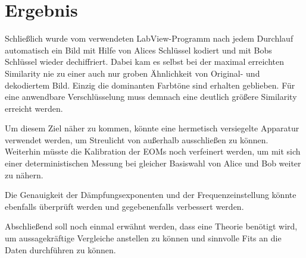 \section{Ergebnis}

Schließlich wurde vom verwendeten LabView-Programm nach jedem Durchlauf
automatisch ein Bild mit Hilfe von Alices Schlüssel kodiert und mit Bobs
Schlüssel wieder dechiffriert. Dabei kam es selbst bei der maximal erreichten
Similarity nie zu einer auch nur groben Ähnlichkeit von Original- und
dekodiertem Bild. Einzig die dominanten Farbtöne sind erhalten geblieben. Für
eine anwendbare Verschlüsselung muss demnach eine deutlich größere Similarity
erreicht werden.

Um diesem Ziel näher zu kommen, könnte eine hermetisch versiegelte Apparatur
verwendet werden, um Streulicht von außerhalb ausschließen zu können. Weiterhin
müsste die Kalibration der EOMs noch verfeinert werden, um mit sich einer
deterministischen Messung bei gleicher Basiswahl von Alice und Bob weiter zu
nähern. 

Die Genauigkeit der Dämpfungsexponenten und der Frequenzeinstellung könnte
ebenfalls überprüft werden und gegebenenfalls verbessert werden.

Abschließend soll noch einmal erwähnt werden, dass eine Theorie benötigt wird,
um aussagekräftige Vergleiche anstellen zu können und sinnvolle Fits an die
Daten durchführen zu können. 